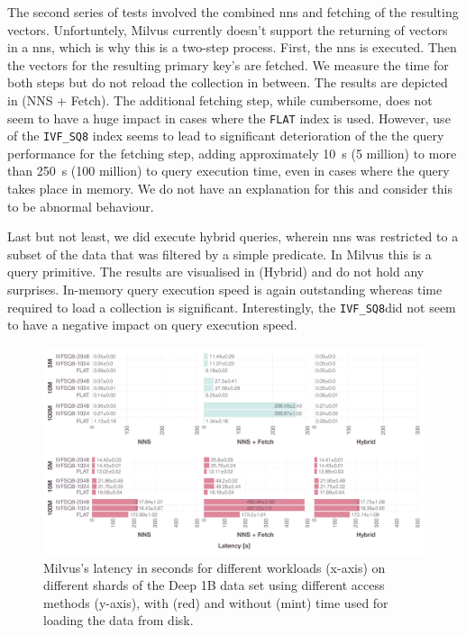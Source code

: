 The second series of tests involved the combined \acrshort{nns} and fetching of the resulting vectors. Unfortuntely, Milvus currently doesn't support the returning of vectors in a \acrshort{nns}, which is why this is a two-step process. First, the \acrshort{nns} is executed. Then the vectors for the resulting primary key's are fetched. We measure the time for both steps but do not reload the collection in between. The results are depicted in  (NNS + Fetch). The additional fetching step, while cumbersome, does not seem to have a huge impact in cases where the \texttt{FLAT} index is used. However, use of the \texttt{IVF\_SQ8} index seems to lead to significant deterioration of the the query performance for the fetching step, adding approximately \SI{10}{\second} (5 million) to more than \SI{250}{\second} (100 million) to query execution time, even in cases where the query takes place in memory. We do not have an explanation for this and consider this to be abnormal behaviour.

Last but not least, we did execute hybrid queries, wherein \acrshort{nns} was restricted to a subset of the data that was filtered by a simple predicate. In Milvus this is a query primitive. The results are visualised in  (Hybrid) and do not hold any surprises. In-memory query execution speed is again outstanding whereas time required to load a collection is significant. Interestingly, the \texttt{IVF\_SQ8}did not seem to have a negative impact on query execution speed.

\begin{landscape}
    \begin{figure}[p]
        \includegraphics[width=1.6\textwidth]{figures/bignns/milvus/bignns-milvus}
        \caption{Milvus's latency in seconds for different workloads (x-axis) on different shards of the Deep 1B data set using different access methods (y-axis), with (red) and without (mint) time used for loading the data from disk.}
        \label{figure:milvus_runtime}
    \end{figure}
\end{landscape}

